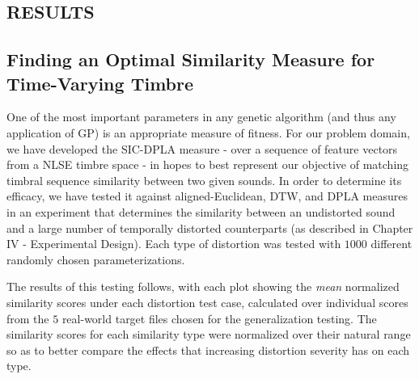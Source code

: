 \documentclass[12pt]{report} 	%
\numberwithin{figure}{chapter}
\numberwithin{table}{chapter}
\numberwithin{equation}{chapter}
\begin{document}
\begin{flushleft}
\chapter{RESULTS} %
\section{Finding an Optimal Similarity Measure for Time-Varying Timbre}
One of the most important parameters in any genetic algorithm (and thus any application of GP) is an appropriate measure of fitness. For our problem domain, we have developed the SIC-DPLA measure - over a sequence of feature vectors from a NLSE timbre space - in hopes to best represent our objective of matching timbral sequence similarity between two given sounds. In order to determine its efficacy, we have tested it against aligned-Euclidean, DTW, and DPLA measures in an experiment that determines the similarity between an undistorted sound and a large number of temporally distorted counterparts (as described in Chapter IV - Experimental Design). Each type of distortion was tested with $1000$ different randomly chosen parameterizations.

The results of this testing follows, with each plot showing the \textit{mean} normalized similarity scores under each distortion test case, calculated over individual scores from the $5$ real-world target files chosen for the generalization testing. The similarity scores for each similarity type were normalized over their natural range so as to better compare the effects that increasing distortion severity has on each type.


\end{flushleft}
\end{document}
